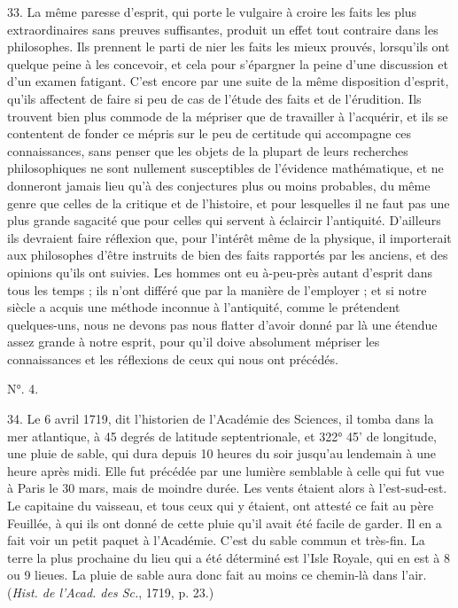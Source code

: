 \documentclass[a4paper, 11pt, oneside, polutonikogreek, french]{article}
\begin{document}
33. La même paresse d'esprit, qui porte le vulgaire à croire les faits les plus extraordinaires sans preuves suffisantes, produit un effet tout contraire dans les philosophes. Ils prennent le parti de nier les faits les mieux prouvés, lorsqu'ils ont quelque peine à les concevoir, et cela pour s'épargner la peine d'une discussion et d'un examen fatigant. C'est encore par une suite de la même disposition d'esprit, qu'ils affectent de faire si peu de cas de l'étude des faits et de l'érudition. Ils trouvent bien plus commode de la mépriser que de travailler à l'acquérir, et ils se contentent de fonder ce mépris sur le peu de certitude qui accompagne ces connaissances, sans penser que les objets de la plupart de leurs recherches philosophiques ne sont nullement susceptibles de l'évidence mathématique, et ne donneront jamais lieu qu'à des conjectures plus ou moins probables, du même genre que celles de la critique et de l'histoire, et pour lesquelles il ne faut pas une plus grande sagacité que pour celles qui servent à éclaircir l'antiquité. D'ailleurs ils devraient faire réflexion que, pour l'intérêt même de la physique, il importerait aux philosophes d'être instruits de bien des faits rapportés par les anciens, et des opinions qu'ils ont suivies. Les hommes ont eu à-peu-près autant d'esprit dans tous les temps ; ils n'ont différé que par la manière de l'employer ; et si notre siècle a acquis une méthode inconnue à l'antiquité, comme le prétendent quelques-uns, nous ne devons pas nous flatter d'avoir donné par là une étendue assez grande à notre esprit, pour qu'il doive absolument mépriser les connaissances et les réflexions de ceux qui nous ont précédés.

\begin{center}
N°. 4.
\end{center}

34. Le 6 avril 1719, dit l'historien de l'Académie des Sciences, il tomba dans la mer atlantique, à 45 degrés de latitude septentrionale, et 322° 45' de longitude, une pluie de sable, qui dura depuis 10 heures du soir jusqu'au lendemain à une heure après midi. Elle fut précédée par une lumière semblable à celle qui fut vue à Paris le 30 mars, mais de moindre durée. Les vents étaient alors à l'est-sud-est. Le capitaine du vaisseau, et tous ceux qui y étaient, ont attesté ce fait au père Feuillée, à qui ils ont donné de cette pluie qu'il avait été facile de garder. Il en a fait voir un petit paquet à l'Académie. C'est du sable commun et très-fin. La terre la plus prochaine du lieu qui a été déterminé est l'Isle Royale, qui en est à 8 ou 9 lieues. La pluie de sable aura donc fait au moins ce chemin-là dans l'air. (\emph{Hist. de l'Acad. des Sc.}, 1719, p. 23.)
\end{document}
